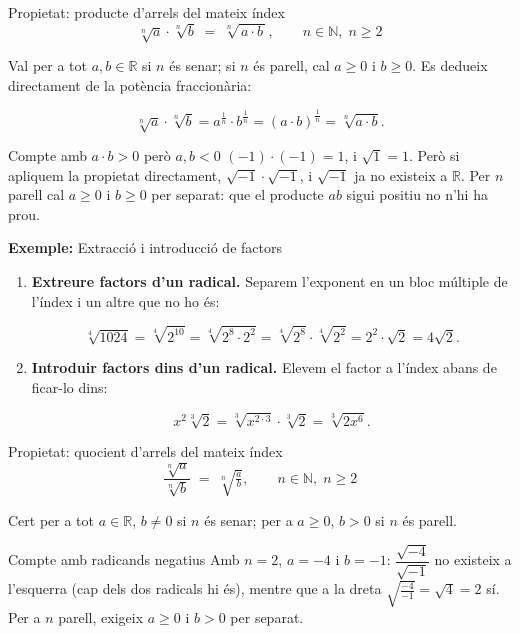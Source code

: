 \begin{propietat}{Propietat: producte d'arrels del mateix índex}
\[
\sqrt[n]{a}\cdot\sqrt[n]{b} \;=\; \sqrt[n]{\,a\cdot b\,},
\qquad n\in\mathbb{N},\; n\ge 2
\]

Val per a tot $a,b\in\mathbb{R}$ si $n$ és senar; si $n$ és parell, cal $a\ge 0$ i $b\ge 0$. Es dedueix directament de la potència fraccionària:

\[
\sqrt[n]{a}\cdot\sqrt[n]{b} = a^{\tfrac{1}{n}} \cdot b^{\tfrac{1}{n}} = (a\cdot b)^{\tfrac{1}{n}} = \sqrt[n]{a\cdot b}.
\]
\end{propietat}

\begin{nota}{Compte amb $a\cdot b>0$ però $a,b<0$}
$(-1)\cdot(-1)=1$, i $\sqrt{1}=1$. Però si apliquem la propietat directament, $\sqrt{-1}\cdot\sqrt{-1}$, i $\sqrt{-1}$ ja no existeix a $\mathbb{R}$. Per $n$ parell cal $a\ge 0$ i $b\ge 0$ per separat: que el producte $ab$ sigui positiu no n'hi ha prou.
\end{nota}

\begin{exemple}{\textbf{Exemple:} Extracció i introducció de factors}
\begin{enumerate}
\item \textbf{Extreure factors d'un radical.} Separem l'exponent en un bloc múltiple de l'índex i un altre que no ho és:

\[
\sqrt[4]{1024} = \sqrt[4]{2^{10}}
= \sqrt[4]{2^{8} \cdot 2^2}
= \sqrt[4]{2^8} \cdot \sqrt[4]{2^{2}}
= 2^{2} \cdot \sqrt{2}
= 4 \sqrt{2}.
\]
\item \textbf{Introduir factors dins d'un radical.} Elevem el factor a l'índex abans de ficar-lo dins:

\[
x^2 \sqrt[3]{2}
= \sqrt[3]{x^{2 \cdot 3}} \cdot \sqrt[3]{2}
= \sqrt[3]{2x^6}.
\]
\end{enumerate}
\end{exemple}

\begin{propietat}{Propietat: quocient d'arrels del mateix índex}
\[
\frac{\sqrt[n]{a}}{\sqrt[n]{b}}
\;=\; \sqrt[n]{\tfrac{a}{b}},
\qquad n \in \mathbb{N},\; n\ge 2
\]

Cert per a tot $a\in\mathbb{R}$, $b\neq 0$ si $n$ és senar; per a $a\ge 0$, $b>0$ si $n$ és parell.
\end{propietat}

\begin{nota}{Compte amb radicands negatius}
Amb $n=2$, $a=-4$ i $b=-1$: $\dfrac{\sqrt{-4}}{\sqrt{-1}}$ no existeix a l'esquerra (cap dels dos radicals hi és), mentre que a la dreta $\sqrt{\tfrac{-4}{-1}} = \sqrt{4} = 2$ sí. Per a $n$ parell, exigeix $a\ge 0$ i $b>0$ per separat.
\end{nota}

